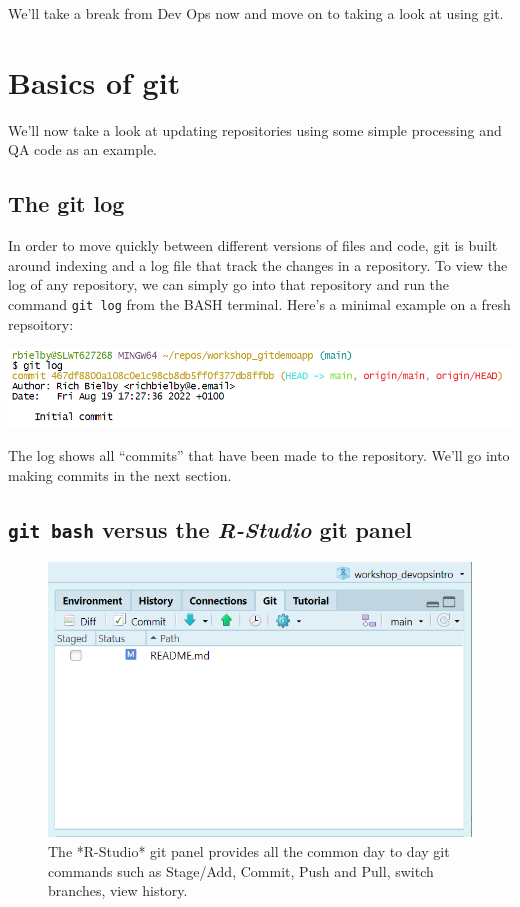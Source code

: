 \documentclass[
  12pt,
]{article}
\begin{document}
We'll take a break from Dev Ops now and move on to taking a look at
using git.

\newpage

\hypertarget{basics-of-git}{%
\section{Basics of git}\label{basics-of-git}}

We'll now take a look at updating repositories using some simple
processing and QA code as an example.

\hypertarget{the-git-log}{%
\subsection{The git log}\label{the-git-log}}

In order to move quickly between different versions of files and code,
git is built around indexing and a log file that track the changes in a
repository. To view the log of any repository, we can simply go into
that repository and run the command \texttt{git\ log} from the BASH
terminal. Here's a minimal example on a fresh repsoitory:

\begin{center}\includegraphics[width=0.8\linewidth]{images/gitdemo/gitdemo-gitlog-1} \end{center}

The log shows all ``commits'' that have been made to the repository.
We'll go into making commits in the next section.

\hypertarget{git-bash-versus-the-r-studio-git-panel}{%
\subsection{\texorpdfstring{\texttt{git\ bash} versus the
\emph{R-Studio} git
panel}{git bash versus the R-Studio git panel}}\label{git-bash-versus-the-r-studio-git-panel}}

\begin{figure}

{\centering \includegraphics[width=0.5\linewidth]{images/gitdemo/gitDemo-RStudio_gitinterface} 

}

\caption{The *R-Studio* git panel provides all the common day to day git commands such as Stage/Add, Commit, Push and Pull, switch branches, view history.}\label{fig:unnamed-chunk-8}
\end{figure}
\end{document}
